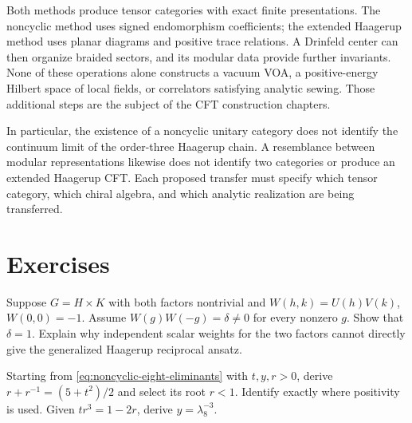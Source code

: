 Both methods produce tensor categories with exact finite
presentations. The noncyclic method uses signed endomorphism
coefficients; the extended Haagerup method uses planar diagrams
and positive trace relations. A Drinfeld center can then organize
braided sectors, and its modular data provide further invariants.
None of these operations alone constructs a vacuum VOA, a
positive-energy Hilbert space of local fields, or correlators
satisfying analytic sewing. Those additional steps are the
subject of the CFT construction chapters.

In particular, the existence of a noncyclic unitary category does
not identify the continuum limit of the order-three Haagerup
chain. A resemblance between modular representations likewise
does not identify two categories or produce an extended
Haagerup CFT. Each proposed transfer must specify which tensor
category, which chiral algebra, and which analytic realization
are being transferred.

\section{Exercises}

\begin{exercise}\label{ex:noncyclic-factorization}
Suppose $G=H\times K$ with both factors nontrivial and
$W(h,k)=U(h)V(k)$, $W(0,0)=-1$. Assume
$W(g)W(-g)=\delta\ne0$ for every nonzero $g$.
Show that $\delta=1$. Explain why independent scalar weights
for the two factors cannot directly give the generalized
Haagerup reciprocal ansatz.

\par\smallskip{}\par
\end{exercise}

\begin{exercise}\label{ex:noncyclic-eight-branch}
Starting from \eqref{eq:noncyclic-eight-eliminants} with $t,y,r>0$,
derive $r+r^{-1}=(5+t^2)/2$ and select its root $r<1$.
Identify exactly where positivity is used. Given
$tr^3=1-2r$, derive $y=\lambda_8^{-3}$.

\par\smallskip{}\par
\end{exercise}

